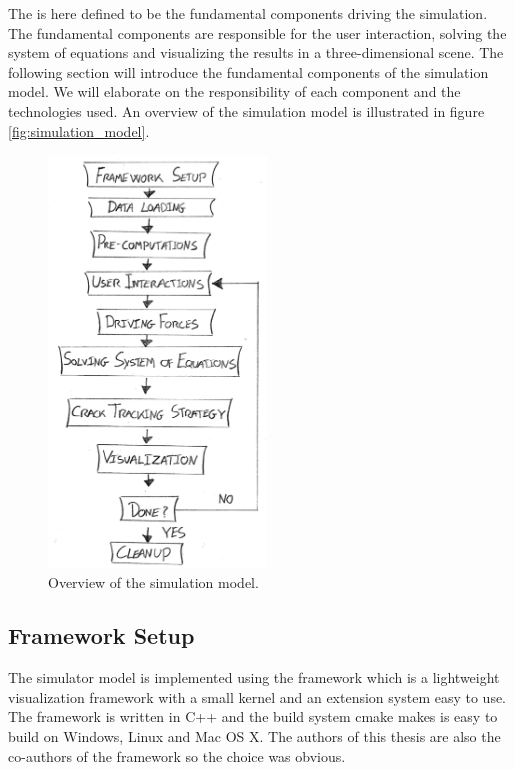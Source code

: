 
The  is here defined to be the fundamental components
driving the simulation. The fundamental components are responsible for
the user interaction, solving the system of equations and visualizing
the results in a three-dimensional scene. 
The following section will introduce the fundamental components of the
simulation model. We will elaborate on the responsibility of each component
and the technologies used.
%
An overview of the simulation model is illustrated in figure
\vref{fig:simulation_model}.  

\begin{figure}
  \centering
  \includegraphics[width=5.8cm]{./images/simulation_model.png}
\caption{Overview of the simulation model.}
\label{fig:simulation_model}
\end{figure}

\subsection*{Framework Setup}
The simulator model is implemented using the
\openengine{} framework
which is a lightweight visualization framework with a small kernel and
an extension system easy to use. The framework is written
in C++ and the build system
cmake makes is easy to build on Windows,
Linux and Mac OS X. The authors of this thesis are also the co-authors of
the \openengine{} framework so the choice was obvious. \\
 
